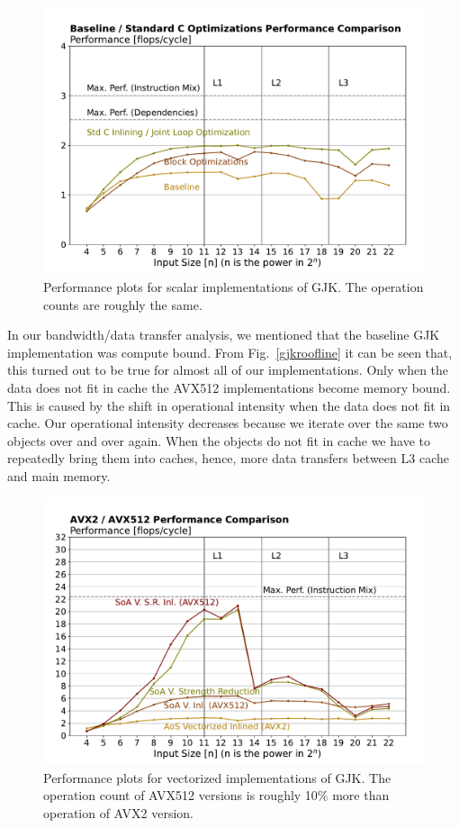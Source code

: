 \documentclass[twocolumn]{article}
\begin{document}
\begin{figure}[!ht]
\includegraphics[width=\linewidth]{gjk_performance_stdc.pdf}
\caption{Performance plots for scalar implementations of GJK.  The operation counts are roughly the same. }
\label{gjkperformancestdc}
\end{figure}

In our bandwidth/data transfer analysis, we mentioned that the baseline GJK implementation was compute bound. From Fig.~\ref{gjkroofline} it can be seen that, this turned out to be true for almost all of our implementations.
Only when the data does not fit in cache the AVX512 implementations become memory bound. 
This is caused by the shift in operational intensity when the data does not fit in cache. 
Our operational intensity decreases because we iterate over the same two objects over and over again. 
When the objects do not fit in cache we have to repeatedly bring them into caches, hence, more data transfers between L3 cache and main memory.

\begin{figure}[!ht]
\includegraphics[width=\linewidth]{gjk_performance_avx.pdf}
\caption{Performance plots for vectorized implementations of GJK.  The operation count of AVX512 versions is roughly 10\% more than operation of AVX2 version. }
\label{gjkperformanceavx}
\end{figure}
\end{document}
